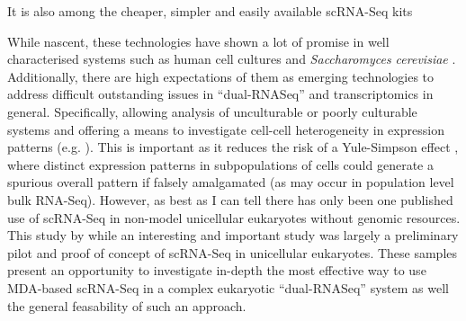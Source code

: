 It is also among the cheaper, simpler and easily available scRNA-Seq kits 



While nascent, these technologies have shown a lot of promise in well characterised systems such as human cell cultures \citep{Bengtsson2005,Shalek2013}
and \textit{Saccharomyces cerevisiae} \citep{Lipson2009}.  
    Additionally, there are high expectations of them as emerging technologies to address difficult outstanding issues in ``dual-RNASeq'' \citep{Westermann2012} and transcriptomics 
    in general.
Specifically, allowing analysis of unculturable or poorly culturable systems \citep{Murray2012} and offering a means to investigate cell-cell heterogeneity 
in expression patterns (e.g. \citep{Raj2008,Shalek2013}).  This is important as it reduces the risk of a Yule-Simpson effect \citep{Yule1903a,Simpson1951}, where
distinct expression patterns in subpopulations of cells could generate a spurious overall pattern if falsely amalgamated (as may occur in population level
bulk RNA-Seq).  However, as best as I can tell there has only been one published use of scRNA-Seq in non-model unicellular eukaryotes without genomic resources.
This study by \citet{Kolisko2014} while an interesting and important study was largely a preliminary pilot and proof of concept of scRNA-Seq in unicellular 
eukaryotes.  These samples present an opportunity to investigate in-depth the most effective way to use MDA-based scRNA-Seq in a complex
eukaryotic ``dual-RNASeq'' system as well the general feasability of such an approach.




